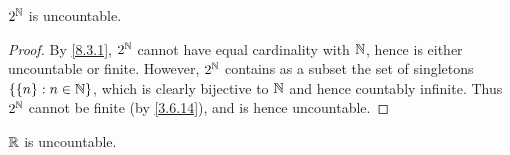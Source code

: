 \begin{cor}\label{8.3.3}
  \(2^{\mathbb{N}}\) is uncountable.
\end{cor}

\begin{proof}
  By \cref{8.3.1}, \(2^{\mathbb{N}}\) cannot have equal cardinality with \(\mathbb{N}\), hence is either uncountable or finite.
  However, \(2^{\mathbb{N}}\) contains as a subset the set of singletons \(\left\lbrace\left\lbrace n\right\rbrace : n \in \mathbb{N}\right\rbrace\), which is clearly bijective to \(\mathbb{N}\) and hence countably infinite.
  Thus \(2^{\mathbb{N}}\) cannot be finite (by \cref{3.6.14}), and is hence uncountable.
\end{proof}

\begin{cor}\label{8.3.4}
  \(\mathbb{R}\) is uncountable.
\end{cor}

